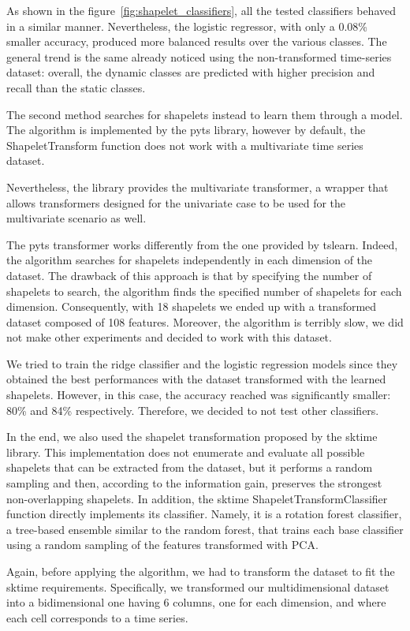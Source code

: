 \documentclass[10pt, a4paper, twocolumn]{article}
\begin{document}
As shown in the figure~\ref{fig:shapelet_classifiers}, all the tested classifiers behaved in a similar manner. Nevertheless, the logistic regressor, with only a 0.08\% smaller accuracy, produced more balanced results over the various classes. The general trend is the same already noticed using the non-transformed time-series dataset: overall, the dynamic classes are predicted with higher precision and recall than the static classes. 

The second method searches for shapelets instead to learn them through a model. The algorithm is implemented by the pyts library, however by default, the ShapeletTransform function does not work with a multivariate time series dataset.

Nevertheless, the library provides the multivariate transformer, a wrapper that allows transformers designed for the univariate case to be used for the multivariate scenario as well. 

The pyts transformer works differently from the one provided by tslearn. Indeed, the algorithm searches for shapelets independently in each dimension of the dataset. The drawback of this approach is that by specifying the number of shapelets to search, the algorithm finds the specified number of shapelets for each dimension. Consequently, with 18 shapelets we ended up with a transformed dataset composed of 108 features. Moreover, the algorithm is terribly slow, we did not make other experiments and decided to work with this dataset. 

We tried to train the ridge classifier and the logistic regression models since they obtained the best performances with the dataset transformed with the learned shapelets. However, in this case, the accuracy reached was significantly smaller: 80\% and 84\% respectively. Therefore, we decided to not test other classifiers. 

In the end, we also used the shapelet transformation proposed by the sktime library. This implementation does not enumerate and evaluate all possible shapelets that can be extracted from the dataset, but it performs a random sampling and then, according to the information gain, preserves the strongest non-overlapping shapelets. In addition, the sktime ShapeletTransformClassifier function directly implements its classifier. Namely, it is a rotation forest classifier, a tree-based ensemble similar to the random forest, that trains each base classifier using a random sampling of the features transformed with PCA.

Again, before applying the algorithm, we had to transform the dataset to fit the sktime requirements. Specifically, we transformed our multidimensional dataset into a bidimensional one having 6 columns, one for each dimension, and where each cell corresponds to a time series. 
\end{document}
